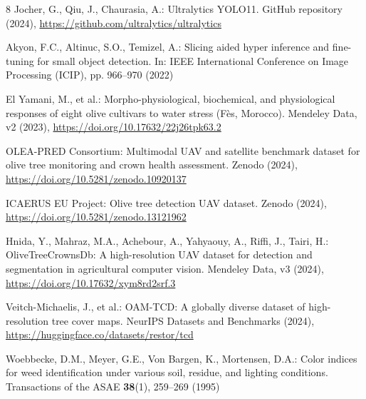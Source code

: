 \documentclass[runningheads]{llncs}
\begin{document}
\begin{thebibliography}{8}
Jocher, G., Qiu, J., Chaurasia, A.: Ultralytics YOLO11. GitHub repository (2024), \url{https://github.com/ultralytics/ultralytics}

Akyon, F.C., Altinuc, S.O., Temizel, A.: Slicing aided hyper inference and fine-tuning for small object detection. In: IEEE International Conference on Image Processing (ICIP), pp. 966--970 (2022)

El Yamani, M., et al.: Morpho-physiological, biochemical, and physiological responses of eight olive cultivars to water stress (Fès, Morocco). Mendeley Data, v2 (2023), \url{https://doi.org/10.17632/22j26tpk63.2}

OLEA-PRED Consortium: Multimodal UAV and satellite benchmark dataset for olive tree monitoring and crown health assessment. Zenodo (2024), \url{https://doi.org/10.5281/zenodo.10920137}

ICAERUS EU Project: Olive tree detection UAV dataset. Zenodo (2024), \url{https://doi.org/10.5281/zenodo.13121962}

Hnida, Y., Mahraz, M.A., Achebour, A., Yahyaouy, A., Riffi, J., Tairi, H.: OliveTreeCrownsDb: A high-resolution UAV dataset for detection and segmentation in agricultural computer vision. Mendeley Data, v3 (2024), \url{https://doi.org/10.17632/xym8rd2srf.3}

Veitch-Michaelis, J., et al.: OAM-TCD: A globally diverse dataset of high-resolution tree cover maps. NeurIPS Datasets and Benchmarks (2024), \url{https://huggingface.co/datasets/restor/tcd}

Woebbecke, D.M., Meyer, G.E., Von Bargen, K., Mortensen, D.A.: Color indices for weed identification under various soil, residue, and lighting conditions. Transactions of the ASAE \textbf{38}(1), 259--269 (1995)
\end{thebibliography}
\end{document}
